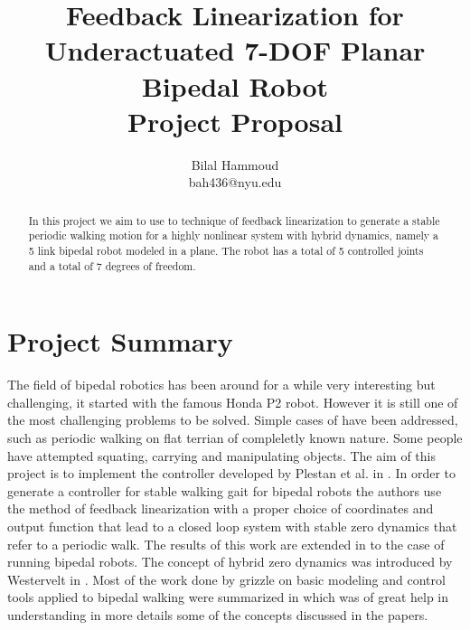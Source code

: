 \documentclass[letterpaper, 10 pt, conference]{ieeeconf}  %
\title{\LARGE \bf
Feedback Linearization for Underactuated 7-DOF Planar Bipedal Robot \\ Project Proposal}
\author{Bilal Hammoud \\ bah436@nyu.edu}
\begin{document}
\maketitle
\thispagestyle{empty}
\pagestyle{empty}

\begin{abstract}
  In this project we aim to use to technique of feedback linearization to generate a stable periodic walking motion for a highly nonlinear system with hybrid dynamics, namely a 5 link bipedal robot modeled in a plane. The robot has a total of 5 controlled joints and a total of 7 degrees of freedom.
 
\end{abstract}
 

\section{Project Summary}

The field of bipedal robotics has been around for a while very interesting but challenging, it started with the famous Honda P2 robot. However it is still one of the most challenging problems to be solved. Simple cases of have been addressed, such as periodic walking on flat terrian of compleletly known nature. Some people have attempted squating, carrying and manipulating objects.
The aim of this project is to implement the controller developed by Plestan et al. in \cite{plestan2003stable}. In order to generate a controller for stable walking gait for bipedal robots the authors use the method of feedback linearization with a proper choice of coordinates and output function that lead to a closed loop system with stable zero dynamics that refer to a periodic walk. The results of this work are extended in \cite{chevallereau2005asymptotically} to the case of running bipedal robots. The concept of hybrid zero dynamics was introduced by Westervelt in \cite{westervelt2002zero}. Most of the work done by grizzle on basic modeling and control tools applied to bipedal walking were summarized in \cite{westervelt2007feedback} which was of great help in understanding in more details some of the concepts discussed in the papers.




\end{document}
